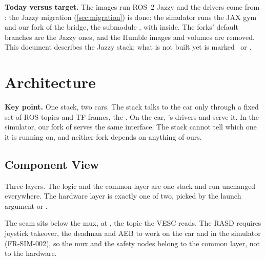 \documentclass[11pt,a4paper]{article}
\newcommand{\prop}{\target{Proposed}}
\begin{document}
\begin{caveat}
\textbf{Today versus target.} The images run ROS~2 Jazzy and the drivers come from : the Jazzy migration (\cref{sec:migration}) is done: the simulator runs the JAX gym and our fork of the bridge, the submodule , with  inside. The forks' default branches are the Jazzy ones, and the Humble images and volumes are removed. This document describes the Jazzy stack; what is not built yet is marked \prop\ or \tbd.
\end{caveat}

\section{Architecture}\label{sec:arch}
\begin{takeaway}
\textbf{Key point.} One stack, two cars. The stack talks to the car only through a fixed set of ROS topics and TF frames, the . On the car, 's drivers and  serve it. In the simulator, our fork of  serves the same interface. The stack cannot tell which one it is running on, and neither fork depends on anything of ours. \prop
\end{takeaway}

\subsection{Component View}
Three layers. The logic and the common layer are one stack and run unchanged everywhere. The hardware layer is exactly one of two, picked by the launch argument  or .

The seam sits below the mux, at , the topic the VESC reads. The RASD requires joystick takeover, the deadman and AEB to work on the car and in the simulator (FR-SIM-002), so the mux and the safety nodes belong to the common layer, not to the hardware.
\end{document}
